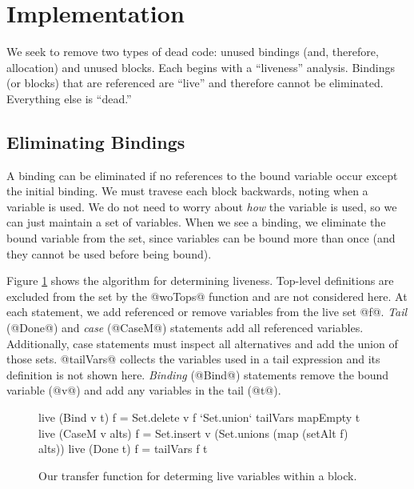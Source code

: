 \documentclass[12pt]{report}
\begin{document}


\section{Implementation}
We seek to remove two types of dead code: unused bindings (and,
therefore, allocation) and unused blocks. Each begins with a
``liveness'' analysis. Bindings (or blocks) that are referenced are ``live''
and therefore cannot be eliminated. Everything else is ``dead.'' 

\subsection{Eliminating Bindings}

A binding can be eliminated if no references to the bound variable
occur except the initial binding. We must travese each block
backwards, noting when a variable is used. We do not need to worry
about \emph{how} the variable is used, so we can just maintain a set
of variables. When we see a binding, we eliminate the bound variable
from the set, since variables can be bound more than once (and they
cannot be used before being bound).


Figure \ref{ref_fig_liveTransfer} shows the algorithm for determining
liveness.  Top-level definitions are excluded from the set by the
@woTops@ function and are not considered here. 
At each statement, we add referenced or remove variables from
the live set @f@. \emph{Tail} (@Done@) and \emph{case} (@CaseM@)
statements add all referenced variables. Additionally, case statements
must inspect all alternatives and add the union of those
sets. @tailVars@ collects the variables used in a tail expression and
its definition is not shown here. \emph{Binding} (@Bind@) statements
remove the bound variable (@v@) and add any variables in the tail
(@t@).

\begin{figure}[h]
\begin{code}
live (Bind v t) f = Set.delete v f  `Set.union` tailVars mapEmpty t
live (CaseM v alts) f = Set.insert v (Set.unions (map (setAlt f) alts))
live (Done t) f = tailVars f t
\end{code}
\caption{Our transfer function for determing live variables within a block.}
\label{ref_fig_liveTransfer}
\end{figure}
\end{document}
